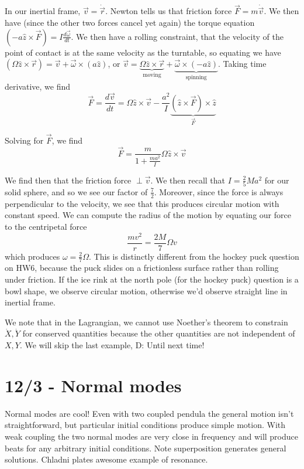 \documentclass[10pt]{report}
\newcommand{\rd}[2]{\frac{d#1}{d#2}}
\begin{document}
In our inertial frame, $\vec{v} = \dot{\vec{r}}$. Newton tells us that friction force $\vec{F} = m\dot{\vec{v}}$. We then have (since the other two forces cancel yet again) the torque equation $\left( -a\hat{z} \times\vec{F} \right) = I\rd{\vec{\omega}}{t}$. We then have a rolling constraint, that the velocity of the point of contact is at the same velocity as the turntable, so equating we have $(\Omega \hat{z} \times \vec{r}) = \vec{v} + \vec{\omega}\times(a\hat{z})$, or $\vec{v} = \underbrace{\Omega \hat{z}\times \vec{r}}_{\text{moving}} + \underbrace{\vec{\omega}\times(-a\hat{z})}_{\text{spinning}}$. Taking time derivative, we find
$$\vec{F} = \rd{\vec{v}}{t} = \Omega\hat{z} \times\vec{v} - \frac{a^2}{I}\underbrace{\left( \hat{z}\times \vec{F} \right)\times\hat{z}}_{\vec{F}}$$

Solving for $\vec{F}$, we find
$$\vec{F} = \frac{m}{1+\frac{ma^2}{I}}\Omega \hat{z} \times \vec{v}$$

We find then that the friction force $\perp \vec{v}$. We then recall that $I = \frac{2}{5}Ma^2$ for our solid sphere, and so we see our factor of $\frac{7}{2}$. Moreover, since the force is always perpendicular to the velocity, we see that this produces circular motion with constant speed. We can compute the radius of the motion by equating our force to the centripetal force
$$\frac{mv^2}{r} = \frac{2M}{7}\Omega v$$
which produces $\omega = \frac{2}{7}\Omega$. This is distinctly different from the hockey puck question on HW6, because the puck slides on a frictionless surface rather than rolling under friction. If the ice rink at the north pole (for the hockey puck) question is a bowl shape, we observe circular motion, otherwise we'd observe straight line in inertial frame.

We note that in the Lagrangian, we cannot use Noether's theorem to constrain $\dot{X}, \dot{Y}$ for conserved quantities because the other quantities are not independent of $X,Y$. We will skip the last example, D: Until next time!

\chapter{12/3 - Normal modes}

Normal modes are cool! Even with two coupled pendula the general motion isn't straightforward, but particular initial conditions produce simple motion. With weak coupling the two normal modes are very close in frequency and will produce beats for any arbitrary initial conditions. Note superposition generates general solutions. Chladni plates awesome example of resonance. 
\end{document}
